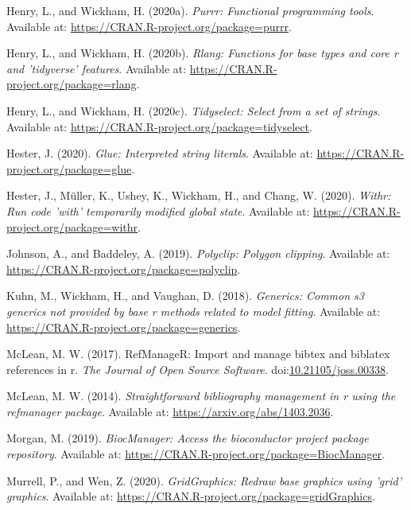 \documentclass[utf8]{frontiersSCNS}
\begin{document}
\leavevmode\hypertarget{ref-henry2020purrr}{}%
Henry, L., and Wickham, H. (2020a). \emph{Purrr: Functional programming
tools}. Available at: \url{https://CRAN.R-project.org/package=purrr}.

\leavevmode\hypertarget{ref-henry2020rlang}{}%
Henry, L., and Wickham, H. (2020b). \emph{Rlang: Functions for base
types and core r and 'tidyverse' features}. Available at:
\url{https://CRAN.R-project.org/package=rlang}.

\leavevmode\hypertarget{ref-henry2020tidyselect}{}%
Henry, L., and Wickham, H. (2020c). \emph{Tidyselect: Select from a set
of strings}. Available at:
\url{https://CRAN.R-project.org/package=tidyselect}.

\leavevmode\hypertarget{ref-hester2020glue}{}%
Hester, J. (2020). \emph{Glue: Interpreted string literals}. Available
at: \url{https://CRAN.R-project.org/package=glue}.

\leavevmode\hypertarget{ref-hester2020withr}{}%
Hester, J., Müller, K., Ushey, K., Wickham, H., and Chang, W. (2020).
\emph{Withr: Run code 'with' temporarily modified global state}.
Available at: \url{https://CRAN.R-project.org/package=withr}.

\leavevmode\hypertarget{ref-johnson2019polyclip}{}%
Johnson, A., and Baddeley, A. (2019). \emph{Polyclip: Polygon clipping}.
Available at: \url{https://CRAN.R-project.org/package=polyclip}.

\leavevmode\hypertarget{ref-kuhn2018generics}{}%
Kuhn, M., Wickham, H., and Vaughan, D. (2018). \emph{Generics: Common s3
generics not provided by base r methods related to model fitting}.
Available at: \url{https://CRAN.R-project.org/package=generics}.

\leavevmode\hypertarget{ref-mclean2017refmanager}{}%
McLean, M. W. (2017). RefManageR: Import and manage bibtex and biblatex
references in r. \emph{The Journal of Open Source Software}.
doi:\href{https://doi.org/10.21105/joss.00338}{10.21105/joss.00338}.

\leavevmode\hypertarget{ref-mclean2014straightforward}{}%
McLean, M. W. (2014). \emph{Straightforward bibliography management in r
using the refmanager package}. Available at:
\url{https://arxiv.org/abs/1403.2036}.

\leavevmode\hypertarget{ref-morgan2019biocmanager}{}%
Morgan, M. (2019). \emph{BiocManager: Access the bioconductor project
package repository}. Available at:
\url{https://CRAN.R-project.org/package=BiocManager}.

\leavevmode\hypertarget{ref-murrell2020gridgraphics}{}%
Murrell, P., and Wen, Z. (2020). \emph{GridGraphics: Redraw base
graphics using 'grid' graphics}. Available at:
\url{https://CRAN.R-project.org/package=gridGraphics}.
\end{document}
